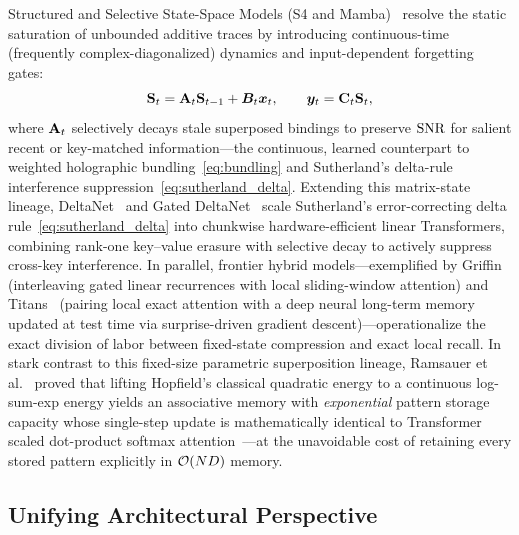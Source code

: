 Structured and Selective State-Space Models (S4 and Mamba)~\cite{GU_SSM_S4_MAMBA} resolve the static saturation of unbounded additive traces by introducing continuous-time (frequently complex-diagonalized) dynamics and input-dependent forgetting gates:
\begin{equation}\label{eq:ssm_recurrence}
    \mathbf{S}_t = \mathbf{A}_t \mathbf{S}_{t-1} + \boldsymbol{B}_t \boldsymbol{x}_t,
    \qquad
    \boldsymbol{y}_t = \mathbf{C}_t \mathbf{S}_t,
\end{equation}
where $\mathbf{A}_t$ selectively decays stale superposed bindings to preserve $\mathrm{SNR}$ for salient recent or key-matched information---the continuous, learned counterpart to weighted holographic bundling~\eqref{eq:bundling} and Sutherland's delta-rule interference suppression~\eqref{eq:sutherland_delta}.
Extending this matrix-state lineage, DeltaNet~\cite{YANG_2024_DELTANET} and Gated DeltaNet~\cite{YANG_2025_GATED_DELTANET} scale Sutherland's error-correcting delta rule~\eqref{eq:sutherland_delta} into chunkwise hardware-efficient linear Transformers, combining rank-one key--value erasure with selective decay to actively suppress cross-key interference.
In parallel, frontier hybrid models---exemplified by Griffin~\cite{DE_2024_GRIFFIN} (interleaving gated linear recurrences with local sliding-window attention) and Titans~\cite{BEHROUZ_2025_TITANS} (pairing local exact attention with a deep neural long-term memory updated at test time via surprise-driven gradient descent)---operationalize the exact division of labor between fixed-state compression and exact local recall.
In stark contrast to this fixed-size parametric superposition lineage, Ramsauer et al.~\cite{RAMSAUER_MODERN_HOPFIELD} proved that lifting Hopfield's classical quadratic energy to a continuous log-sum-exp energy yields an associative memory with \emph{exponential} pattern storage capacity whose single-step update is mathematically identical to Transformer scaled dot-product softmax attention~\cite{VASWANI_TRANSFORMER}---at the unavoidable cost of retaining every stored pattern explicitly in $\mathcal{O}\!\left(ND\right)$ memory.

\subsection{Unifying Architectural Perspective}\label{sec:history:synthesis}


